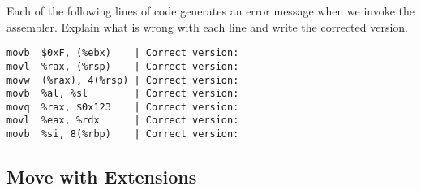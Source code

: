 \documentclass{article}
\begin{document}
\vspace{5pt}

Each of the following lines of code generates an error message when we invoke the assembler. Explain what is wrong with each line and write the corrected version.

\vspace{10pt}

\begin{lstlisting}[basicstyle=\ttfamily, frame=none]
movb  $0xF, (%ebx)    | Correct version: 
movl  %rax, (%rsp)    | Correct version:
movw  (%rax), 4(%rsp) | Correct version:
movb  %al, %sl        | Correct version:
movq  %rax, $0x123    | Correct version:
movl  %eax, %rdx      | Correct version:
movb  %si, 8(%rbp)    | Correct version:
\end{lstlisting}

\clearpage %

\subsection{Move with Extensions}
\end{document}
